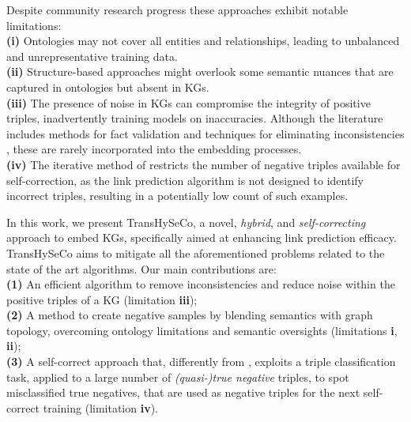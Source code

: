 \documentclass[sigconf]{acmart}
\newcommand{\TransHI}{TransHySeCo\xspace}
\begin{document}
Despite community research progress these approaches exhibit notable limitations:\\
    \noindent \textbf{(i)} Ontologies may not cover all entities and relationships, leading to unbalanced and unrepresentative training data.\\
    \textbf{(ii)} Structure-based approaches might overlook some semantic nuances that are captured in ontologies but absent in KGs. \\
    \textbf{(iii)} The presence of noise in KGs can compromise the integrity of positive triples, inadvertently training models on inaccuracies. Although the literature includes methods for fact validation and techniques for eliminating inconsistencies \cite{inconsistenciesinKG,topper,bonatti}, these are rarely incorporated into the embedding processes.\\
    \textbf{(iv)} The iterative method of \cite{paperiterative} restricts the number of negative triples available for self-correction, as the link prediction algorithm is not designed to identify incorrect triples, resulting in a potentially low count of such examples.

In this work, we present \TransHI, a novel, \textit{hybrid}, and \textit{self-correcting} approach to embed KGs, specifically aimed at enhancing link prediction efficacy. \TransHI aims to mitigate all the aforementioned problems related to the state of the art algorithms.
Our main contributions are:\\  
  \textbf{(1)} An efficient algorithm to remove inconsistencies and reduce noise within the positive triples of a KG (limitation \textbf{iii});\\
  \textbf{(2)} A method to create negative samples by blending semantics with graph topology, overcoming ontology limitations and semantic oversights (limitations \textbf{i}, \textbf{ii}); \\
  \textbf{(3)} A self-correct approach that, differently from \cite{paperiterative}, exploits a triple classification task, applied to a large number of \textit{(quasi-)true negative} triples, to spot misclassified true negatives, that are used as negative triples for the next self-correct training (limitation \textbf{iv}).\\
  
\end{document}
